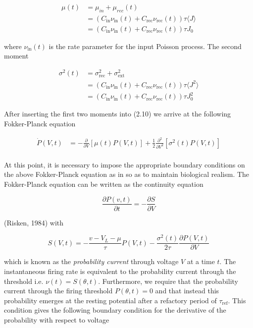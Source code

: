 \documentclass{ucetd}
\begin{document}
\begin{align*}
\mu(t) &= \mu_{in} + \mu_{rec}(t)\\
&= \left(C_{\mathrm{in}}\nu_{\mathrm{in}}(t) + C_{\mathrm{rec}}\nu_{\mathrm{rec}}(t)\right)\tau\langle J\rangle\\
&= \left(C_{\mathrm{in}}\nu_{\mathrm{in}}(t) + C_{\mathrm{rec}}\nu_{\mathrm{rec}}(t)\right)\tau J_{0}
\end{align*}

where $\nu_{\mathrm{in}}(t)$ is the rate parameter for the input Poisson process. The second moment

\begin{align*}
\sigma^{2}(t) &= \sigma_{\mathrm{rec}}^{2} + \sigma_{\mathrm{ext}}^{2}\\
&= \left(C_{\mathrm{in}}\nu_{\mathrm{in}}(t) + C_{\mathrm{rec}}\nu_{\mathrm{rec}}(t)\right)\tau\langle J^{2}\rangle\\
&= \left(C_{\mathrm{in}}\nu_{\mathrm{in}}(t) + C_{\mathrm{rec}}\nu_{\mathrm{rec}}(t)\right)\tau J_{0}^{2}
\end{align*}

After inserting the first two moments into (2.10) we arrive at the following Fokker-Planck equation

\begin{align*}
\dot{P}(V,t) &= -\frac{\partial}{\partial V}[\mu(t)P(V,t)] + \frac{1}{2}\frac{\partial^{2}}{\partial V^{2}}[\sigma^{2}(t)P(V,t)]\\
\end{align*} 

At this point, it is necessary to impose the appropriate boundary conditions on the above Fokker-Planck equation as in so as to maintain biological realism. The Fokker-Planck equation can be written as the continuity equation 

\begin{equation*}
\frac{\partial P(v,t)}{\partial t} = -\frac{\partial S}{\partial V}
\end{equation*}

(Risken, 1984) with 

\begin{equation*}
S(V,t) = -\frac{v-V_{L}-\mu}{\tau}P(V,t) - \frac{\sigma^{2}(t)}{2\tau}\frac{\partial P(V,t)}{\partial V}
\end{equation*}

which is known as the \emph{probability current} through voltage $V$ at a time $t$. The instantaneous firing rate is equivalent to the probability current through the threshold i.e. $\nu(t) = S(\theta,t)$. Furthermore, we require that the probability current through the firing threshold $P(\theta, t)=0$ and that instead this probability emerges at the resting potential after a refactory period of $\tau_{\mathrm{ref}}$. This condition gives the following boundary condition for the derivative of the probability with respect to voltage
\end{document}

